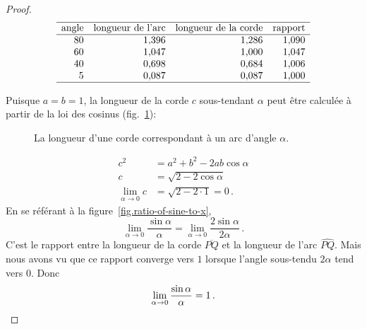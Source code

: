 \begin{proof}
\enlargethispage{\baselineskip}
\vspace{-1ex}

\[
\begin{array}{r@{\hspace{10pt}}r@{\hspace{10pt}}r@{\hspace{10pt}}r}
\hline
\textrm{angle} & \textrm{longueur de l'arc} & \textrm{longueur de la corde} & \textrm{rapport}\\
\hline
80 & \mbox{1,396} & \mbox{1,286}  & \mbox{1,090}\\
60 & \mbox{1,047} & \mbox{1,000}  & \mbox{1,047}\\
40 & \mbox{0,698} & \mbox{0,684} & \mbox{1,006}\\
5  & \mbox{0,087} & \mbox{0,087} &\mbox{1,000} \\\hline
\end{array}
\]

Puisque $a=b=1$, la longueur de la corde $c$ sous-tendant $\alpha$ peut être calculée à partir de la loi des cosinus 
 (fig.~\ref{fig.length-of-a-chord}):
\begin{figure}[htbp]
\centering

\caption{La longueur d'une corde correspondant à un arc d'angle $\alpha$.}\label{fig.length-of-a-chord}
\end{figure}
\begin{align*}
c^2&=a^2+b^2-2ab\cos \alpha\\
c&=\sqrt{2-2\cos \alpha}\\
\lim_{\alpha\rightarrow 0} c&= \sqrt{2-2\cdot 1}=0\,.
\end{align*}
En se référant à la figure~\ref{fig.ratio-of-sine-to-x},
\[
\lim_{\alpha \rightarrow 0} \frac{\sin \alpha}{\alpha} = \lim_{\alpha \rightarrow 0} \frac{2\sin \alpha}{2\alpha}\,.
\]
C'est le rapport entre la longueur de la corde $\overline{PQ}$ et la longueur de l'arc $\widehat{PQ}$.
Mais nous avons vu que ce rapport converge vers $1$ lorsque l'angle sous-tendu $2\alpha$ tend vers $0$. Donc 
\[
\lim_{\alpha \rightarrow 0} \frac{\sin \alpha}{\alpha} = 1\,.\qedhere
\]
\end{proof}


